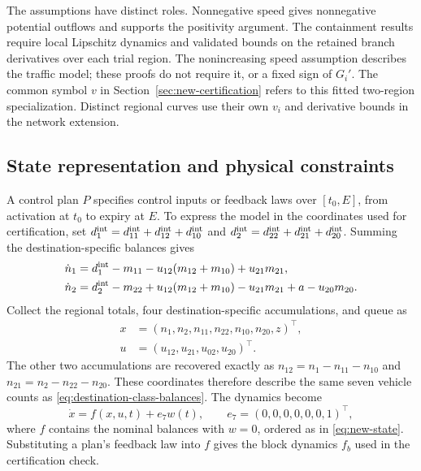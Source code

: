 \documentclass[preprint,12pt]{elsarticle}
\theoremstyle{definition}
\theoremstyle{plain}
\theoremstyle{definition}
\theoremstyle{plain}
\begin{document}
The assumptions have distinct roles. Nonnegative speed gives nonnegative
potential outflows and supports the positivity argument. The containment
results require local Lipschitz dynamics and validated bounds on the
retained branch derivatives over each trial region. The nonincreasing
speed assumption describes the traffic model; these proofs do not require
it, or a fixed sign of $G_i'$. The common symbol $v$ in Section~\ref{sec:new-certification}
refers to this fitted two-region specialization. Distinct regional curves
use their own $v_i$ and derivative bounds in the network extension.

\subsection{State representation and physical constraints}
\label{sec:physical-constraints}

A control plan $P$ specifies control inputs or feedback laws over
$[t_0,E]$, from activation at $t_0$ to expiry at $E$. To express the model in the
coordinates used for certification, set
$d_1^{\rm int}=d_{11}^{\rm int}+d_{12}^{\rm int}+d_{10}^{\rm int}$ and
$d_2^{\rm int}=d_{22}^{\rm int}+d_{21}^{\rm int}+d_{20}^{\rm int}$.
Summing the destination-specific balances gives
\begin{equation}
\begin{aligned}
\dot n_1&=d_1^{\rm int}-m_{11}-u_{12}(m_{12}+m_{10})+u_{21}m_{21},\\
\dot n_2&=d_2^{\rm int}-m_{22}+u_{12}(m_{12}+m_{10})-u_{21}m_{21}
             +a-u_{20}m_{20}.
\end{aligned}
\label{eq:regional-flow-balances}
\end{equation}
Collect the regional totals, four destination-specific accumulations, and queue as
\begin{equation}
\begin{aligned}
x&=(n_1,n_2,n_{11},n_{22},n_{10},n_{20},z)^\top,\\
u&=(u_{12},u_{21},u_{02},u_{20})^\top.
\end{aligned}
\label{eq:new-state}
\end{equation}
The other two accumulations are recovered exactly as
$n_{12}=n_1-n_{11}-n_{10}$ and $n_{21}=n_2-n_{22}-n_{20}$.
These coordinates therefore describe the same seven vehicle counts as
\eqref{eq:destination-class-balances}. The dynamics become
\begin{equation}
 \dot x=f(x,u,t)+e_7w(t),\qquad e_7=(0,0,0,0,0,0,1)^\top,
 \label{eq:new-plant}
\end{equation}
where $f$ contains the nominal balances with $w=0$, ordered as in
\eqref{eq:new-state}. Substituting a plan's feedback law into $f$ gives
the block dynamics $f_b$ used in the certification check.
\end{document}
